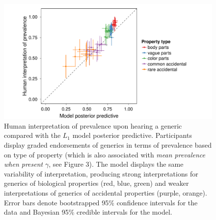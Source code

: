 \documentclass{pnastwo}
\begin{document}
\begin{figure}
\centering
    \includegraphics[width=\columnwidth]{implied-byItem-mh100kX2.pdf}
    \caption{Human interpretation of prevalence upon hearing a generic compared with the $L_1$ model posterior predictive. 
    Participants display graded endorsements of generics in terms of prevalence based on type of property (which is also associated with \emph{mean prevalence when present} $\gamma$, see Figure 3).
    The model displays the same variability of interpretation, producing strong interpretations for generics of biological properties (red, blue, green) and weaker interpretations of generics of accidental properties (purple, orange).
        Error bars denote bootstrapped 95\% confidence intervals for the data and Bayesian 95\% credible intervals for the model.}
  \label{fig:impliedByItem}
\end{figure}
\end{document}
